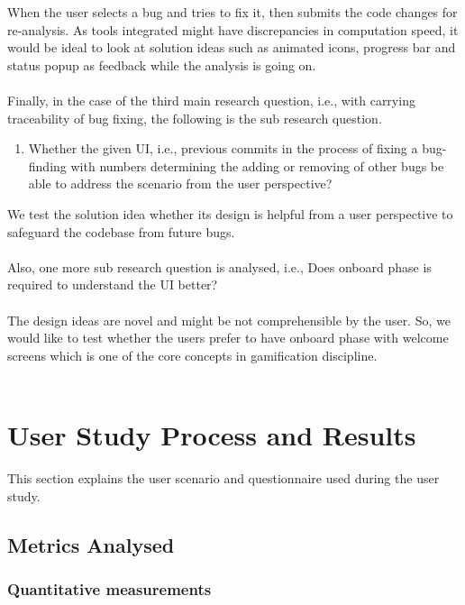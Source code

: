 When the user selects a bug and tries to fix it, then submits the code changes for re-analysis. As tools integrated might have discrepancies in computation speed, it would be ideal to look at solution ideas such as animated icons, progress bar and status popup as feedback while the analysis is going on. \\ \\

Finally, in the case of the third main research question, i.e., with carrying traceability of bug fixing, the following is the sub research question. \\

\begin{enumerate}
	\item Whether the given UI, i.e., previous commits in the process of fixing a bug-finding with numbers determining the adding or removing of other bugs be able to address the scenario from the user perspective? \\
\end{enumerate} 

We test the solution idea whether its design is helpful from a user perspective to safeguard the codebase from future bugs. \\ \\

Also, one more sub research question is analysed, i.e., Does onboard phase is required to understand the UI better? \\ \\

The design ideas are novel and might be not comprehensible by the user. So, we would like to test whether the users prefer to have onboard phase with welcome screens which is one of the core concepts in gamification discipline. \\ \\

\section{User Study Process and Results}

This section explains the user scenario and questionnaire used during the user study.

\subsection{Metrics Analysed}

\subsubsection{Quantitative measurements}  

